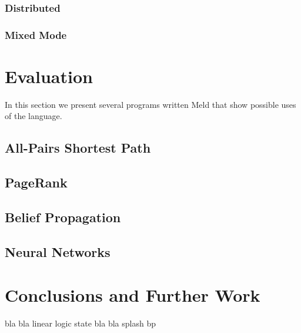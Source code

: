 \documentclass[preprint]{sigplanconf}
\begin{document}
\subsubsection{Distributed}
\subsubsection{Mixed Mode}

\section{Evaluation}\label{sec:evaluation}

In this section we present several programs written Meld that show possible
uses of the language.

\subsection{All-Pairs Shortest Path}

\subsection{PageRank}

\subsection{Belief Propagation}

\subsection{Neural Networks}

\section{Conclusions and Further Work}

bla bla linear logic state bla bla splash bp

\acks






\end{document}
